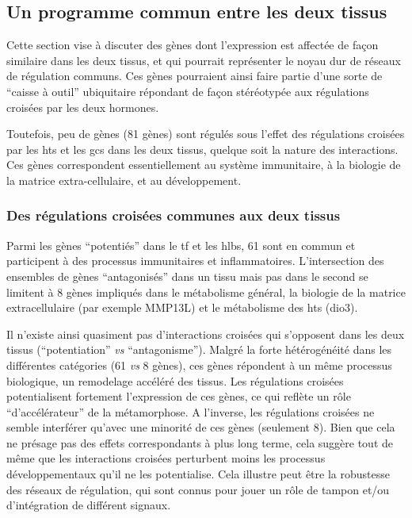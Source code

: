 \documentclass[../main.tex]{subfiles}
\begin{document}
	\subsection{Un programme commun entre les deux tissus}
		Cette section vise à discuter des gènes dont l'expression est affectée de façon similaire dans les deux tissus, et qui pourrait représenter le noyau dur de réseaux de régulation communs.
		Ces gènes pourraient ainsi faire partie d'une sorte de ``caisse à outil'' ubiquitaire répondant de façon stéréotypée aux régulations croisées par les deux hormones.
		\par
		Toutefois, peu de gènes (81 gènes) sont régulés sous l'effet des régulations croisées par les \glspl{ht} et les \glspl{gc} dans les deux tissus, quelque soit la nature des interactions.
		Ces gènes correspondent essentiellement au système immunitaire, à la biologie de la matrice extra-cellulaire, et au développement.

		\subsubsection{Des régulations croisées communes aux deux tissus}
			Parmi les gènes ``potentiés'' dans le \gls{tf} et les \glspl{hlb}, 61 sont en commun et participent à des processus immunitaires et inflammatoires.
			L'intersection des ensembles de gènes ``antagonisés'' dans un tissu mais pas dans le second se limitent à 8 gènes impliqués dans le métabolisme général, la biologie de la matrice extracellulaire (par exemple MMP13L) et le métabolisme des \glspl{ht} (\gls{dio3}).
			\par
			Il n'existe ainsi quasiment pas d'interactions croisées qui s'opposent dans les deux tissus (``potentiation'' \textit{vs} ``antagonisme'').
			Malgré la forte hétérogénéité dans les différentes catégories (61 \textit{vs} 8 gènes), ces gènes répondent à un même processus biologique, un remodelage accéléré des tissus.
			Les régulations croisées potentialisent fortement l'expression de ces gènes, ce qui reflète un rôle ``d'accélérateur'' de la métamorphose.
			A l'inverse, les régulations croisées ne semble interférer qu'avec une minorité de ces gènes (seulement 8).
			Bien que cela ne présage pas des effets correspondants à plus long terme, cela suggère tout de même que les interactions croisées perturbent moins les processus développementaux qu'il ne les potentialise.
			Cela illustre peut être la robustesse des réseaux de régulation, qui sont connus pour jouer un rôle de tampon et/ou d'intégration de différent signaux.
\end{document}
